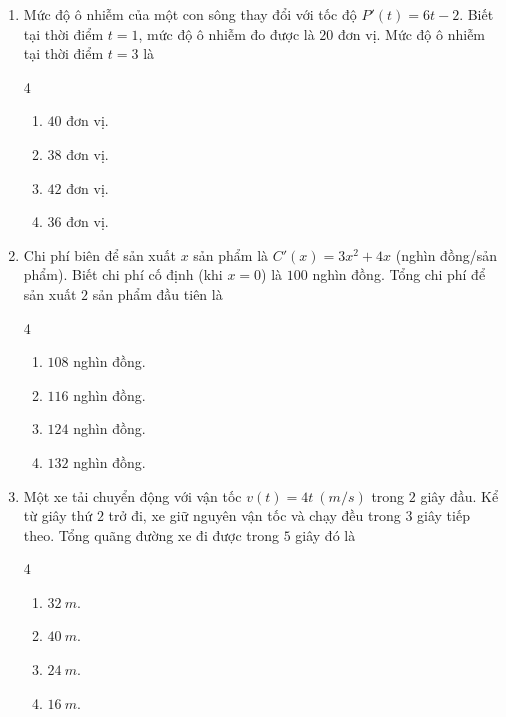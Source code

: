 \documentclass[12pt]{article}
\begin{document}
\begin{enumerate}[label=\textbf{Câu \arabic*.}]
		\item Mức độ ô nhiễm của một con sông thay đổi với tốc độ $P'(t) = 6t - 2$. Biết tại thời điểm $t = 1$, mức độ ô nhiễm đo được là $20$ đơn vị. Mức độ ô nhiễm tại thời điểm $t = 3$ là
		\begin{multicols}{4}
			\begin{enumerate}[label=\textbf{\Alph*.}]
				\item $40$ đơn vị.
				\item $38$ đơn vị.
				\item $42$ đơn vị.
				\item $36$ đơn vị.
			\end{enumerate}
		\end{multicols}
		
		\item Chi phí biên để sản xuất $x$ sản phẩm là $C'(x) = 3x^2 + 4x$ (nghìn đồng/sản phẩm). Biết chi phí cố định (khi $x = 0$) là $100$ nghìn đồng. Tổng chi phí để sản xuất $2$ sản phẩm đầu tiên là
		\begin{multicols}{4}
			\begin{enumerate}[label=\textbf{\Alph*.}]
				\item $108$ nghìn đồng.
				\item $116$ nghìn đồng.
				\item $124$ nghìn đồng.
				\item $132$ nghìn đồng.
			\end{enumerate}
		\end{multicols}
		
		\item Một xe tải chuyển động với vận tốc $v(t) = 4t \ (m/s)$ trong $2$ giây đầu. Kể từ giây thứ $2$ trở đi, xe giữ nguyên vận tốc và chạy đều trong $3$ giây tiếp theo. Tổng quãng đường xe đi được trong $5$ giây đó là
		\begin{multicols}{4}
			\begin{enumerate}[label=\textbf{\Alph*.}]
				\item $32 \ m$.
				\item $40 \ m$.
				\item $24 \ m$.
				\item $16 \ m$.
			\end{enumerate}
		\end{multicols}
		

\end{enumerate}
\end{document}
